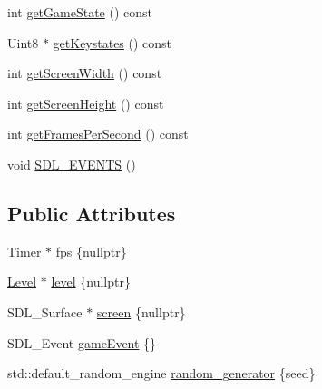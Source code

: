 \begin{DoxyCompactItemize}
\item 
int \hyperlink{classGame_a836331c7add267626662c9d4dee5928c}{get\-Game\-State} () const 
\item 
Uint8 $\ast$ \hyperlink{classGame_a165fa0a71221cd8b26623019f26a924f}{get\-Keystates} () const 
\item 
int \hyperlink{classGame_a2e00c62380b0d3940036e2edab06c2f2}{get\-Screen\-Width} () const 
\item 
int \hyperlink{classGame_a8c7902edc8a3c705fd8bb36847e06b54}{get\-Screen\-Height} () const 
\item 
int \hyperlink{classGame_a040876e97ce91301114c2009323ce8aa}{get\-Frames\-Per\-Second} () const 
\item 
void \hyperlink{classGame_a19d3feebe0343f98e4ccd652adc9db4a}{S\-D\-L\-\_\-\-E\-V\-E\-N\-T\-S} ()
\end{DoxyCompactItemize}
\subsection*{Public Attributes}
\begin{DoxyCompactItemize}
\item 
\hyperlink{classTimer}{Timer} $\ast$ \hyperlink{classGame_a52e8281c6c4ca4a6398e23f0a5d90cce}{fps} \{nullptr\}
\item 
\hyperlink{classLevel}{Level} $\ast$ \hyperlink{classGame_a80f3380b4378e8969e230242c56a3361}{level} \{nullptr\}
\item 
S\-D\-L\-\_\-\-Surface $\ast$ \hyperlink{classGame_acc0f346d45bb53307b52acc9cc65912d}{screen} \{nullptr\}
\item 
S\-D\-L\-\_\-\-Event \hyperlink{classGame_afa62aac0abc3640293e298eec51b85d8}{game\-Event} \{\}
\item 
std\-::default\-\_\-random\-\_\-engine \hyperlink{classGame_a239c35e9816b7571609c870d6070fb4b}{random\-\_\-generator} \{seed\}
\end{DoxyCompactItemize}


